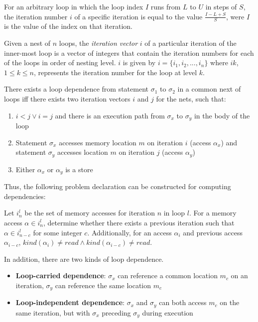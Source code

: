 	For an arbitrary loop in which the loop index $I$ runs from $L$ to $U$ in steps of $S$, the iteration number $i$ of a specific iteration is equal to the value $\frac{I-L+S}{S}$, were $I$ is the value of the index on that iteration.
	
	Given a nest of $n$ loops, the \textit{iteration vector} $i$ of a particular iteration of the inner-most loop is a vector of integers that contain the iteration numbers for each of the loops in order of nesting level. $i$ is given by $i=\{i_1, i_2, ..., i_n\}$ where $ik$, $1 \leq k \leq n$, represents the iteration number for the loop at level $k$.
	
	There exists a loop dependence from statement $\sigma_1$ to $\sigma_2$ in a common next of loops iff there exists two iteration vectors $i$ and $j$ for the nets, such that:
	
	\begin{enumerate}
		\item $i < j \lor i = j$ and there is an execution path from $\sigma_x$ to $\sigma_y$ in the body of the loop
		\item Statement $\sigma_x$ accesses memory location $m$ on iteration $i$ (access $\alpha_x$) and statement $\sigma_y$ accesses location $m$ on iteration $j$ (access $\alpha_y$)
		\item Either $\alpha_x$ or $\alpha_y$ is a store
	\end{enumerate}
	
	Thus, the following problem declaration can be constructed for computing dependencies:
	
	Let $i^l_n$ be the set of memory accesses for iteration $n$ in loop $l$. For a memory access $\alpha \in i^l_n$, determine whether there exists a previous iteration such that $\alpha \in i^l_{n-c}$ for some integer $c$. Additionally, for an access $\alpha_i$ and previous access $\alpha_{i-c}$, $kind(\alpha_i) \neq read \land kind(\alpha_{i-c}) \neq read$.
	
	In addition, there are two kinds of loop dependence.
	
	\begin{itemize}
		\item \textbf{Loop-carried dependence}: $\sigma_x$ can reference a common location $m_c$ on an iteration, $\sigma_y$ can reference the same location $m_c$
		\item \textbf{Loop-independent dependence}: $\sigma_x$ and $\sigma_y$ can both access $m_c$ on the same iteration, but with $\sigma_x$ preceding $\sigma_y$ during execution
	\end{itemize}

